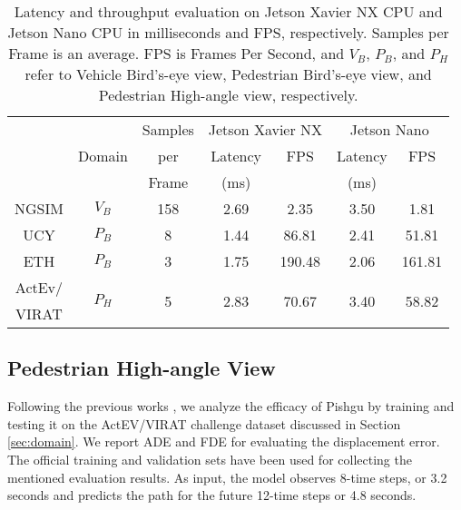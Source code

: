 \documentclass[sigconf]{acmart}
\begin{document}
\begin{table*}[b!]
\centering
\caption{Latency and throughput evaluation on Jetson Xavier NX CPU and  Jetson Nano CPU in milliseconds and FPS, respectively. Samples per Frame is an average. FPS is Frames Per Second, and $V_B$, $P_B$, and $P_H$ refer to Vehicle Bird's-eye view, Pedestrian Bird's-eye view, and Pedestrian High-angle view, respectively.}
\vspace{-10pt}
\label{tab:latency}
\renewcommand{\arraystretch}{1.3}
\begin{adjustbox}{max width = \linewidth,center}
\begin{tabular}{c||c|c||c|c||c|c}
    \rowcolor{DarkGray}
    \cellcolor{Gray} & \cellcolor{Gray} & \cellcolor{Gray} Samples & \multicolumn{2}{c||}{\cellcolor{DarkGray}  Jetson Xavier NX}  & \multicolumn{2}{c}{\cellcolor{DarkGray}  Jetson Nano} \\ \cline{4-7} 
    \rowcolor{Gray}
     & Domain & per   & Latency & FPS & Latency & FPS \\
    \rowcolor{Gray}
     &        & Frame & (ms)    &     & (ms)    &     \\ \hline \hline
NGSIM \cite{NGSIM_i80, NGSIM_US101}     & $V_B$  & 158 & 2.69  & 2.35   & 3.50  & 1.81   \\ \hline
UCY \cite{pellegrini2009you}            & $P_B$  & 8   & 1.44  & 86.81  & 2.41  & 51.81  \\ \hline
ETH \cite{lerner2007crowds}             & $P_B$  & 3   & 1.75  & 190.48 & 2.06  & 161.81 \\ \hline
ActEv/                                  & \multirow{2}{*}{$P_H$}  & \multirow{2}{*}{5}   & \multirow{2}{*}{2.83}  & \multirow{2}{*}{70.67}  & \multirow{2}{*}{3.40}   & \multirow{2}{*}{58.82}  \\
VIRAT \cite{awad2018benchmarking}       &        &     &       &        &       &        \\
\end{tabular}
\end{adjustbox}
\vspace{-10pt}
\end{table*}


\subsection{Pedestrian High-angle View}

Following the previous works \cite{liang2019peeking, liang2020garden, liang2020simaug, li2022graph}, we analyze the efficacy of Pishgu by training and testing it on the ActEV/VIRAT \cite{awad2018benchmarking} challenge dataset discussed in Section \ref{sec:domain}. We report ADE and FDE for evaluating the displacement error. The official training and validation sets have been used for collecting the mentioned evaluation results. As input, the model observes 8-time steps, or 3.2 seconds and predicts the path for the future 12-time steps or 4.8 seconds.
\end{document}
